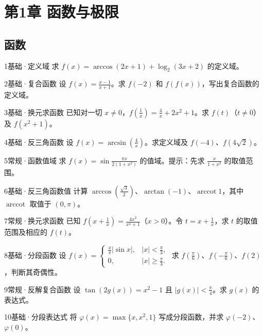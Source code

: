 \section{第1章 函数与极限}
\subsection{函数}
\begin{exercise}{1}{基础·定义域}
求 $f(x)=\arccos(2x+1)+\log_2(3x+2)$ 的定义域。
\end{exercise}
\begin{exercise}{2}{基础·复合函数}
设 $f(x)=\frac{x-1}{x+1}$。求 $f(-2)$ 和 $f(f(x))$，写出复合函数的定义域。
\end{exercise}
\begin{exercise}{3}{基础·换元求函数}
已知对一切 $x\ne0$，$f(\frac{1}{x})=\frac{4}{x}+2x^2+1$。求 $f(t)$（$t\ne0$）及 $f(x^2+1)$。
\end{exercise}
\begin{exercise}{4}{基础·反三角函数}
设 $f(x)=\arcsin(\frac{4}{x})$。求定义域及 $f(-4)$、$f(4\sqrt2)$。
\end{exercise}
\begin{exercise}{5}{常规·函数值域}
求 $f(x)=\sin\frac{\pi x}{2(1+x^2)}$ 的值域。提示：先求 $\frac{x}{1+x^2}$ 的取值范围。
\end{exercise}
\begin{exercise}{6}{基础·反三角函数值}
计算 $\arccos(\frac{\sqrt3}{2})$、$\arctan(-1)$、$\operatorname{arccot}1$，其中 $\operatorname{arccot}$ 取值于 $(0,\pi)$。
\end{exercise}
\begin{exercise}{7}{常规·换元求函数}
已知 $f(x+\frac{1}{x})=\frac{4x^2}{x^4+1}$（$x>0$）。令 $t=x+\frac{1}{x}$，求 $t$ 的取值范围及相应的 $f(t)$。
\end{exercise}
\begin{exercise}{8}{基础·分段函数}
设 $f(x)=\begin{cases}\frac{x}{\pi}|\sin x|,&|x|<\frac{\pi}{3},\\0,&|x|\ge\frac{\pi}{3}.\end{cases}$ 求 $f(\frac{\pi}{6})$、$f(-\frac{\pi}{6})$、$f(2)$，判断其奇偶性。
\end{exercise}
\begin{exercise}{9}{常规·反解复合函数}
设 $\tan(2g(x))=x^2-1$ 且 $|g(x)|<\frac{\pi}{4}$。求 $g(x)$ 的表达式。
\end{exercise}
\begin{exercise}{10}{基础·分段表达式}
将 $\varphi(x)=\max\{x,x^2,1\}$ 写成分段函数，并求 $\varphi(-2)$、$\varphi(0)$。
\end{exercise}
